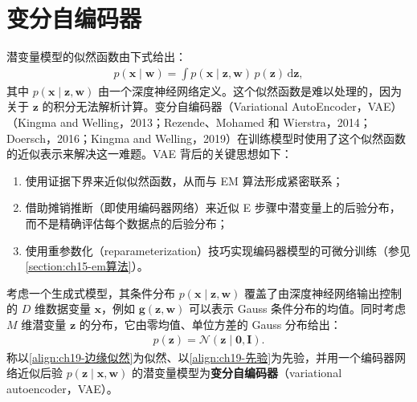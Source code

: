 \documentclass[../../main.tex]{subfiles}
\begin{document}
\section{变分自编码器}\label{section:ch19-变分自编码器}

潜变量模型的似然函数由下式给出：
\begin{align}
p(\bm{x}\mid\bm{w})=\int p(\bm{x}\mid\bm{z},\bm{w})\,p(\bm{z})\,\mathrm{d}\bm{z},
\label{align:ch19-边缘似然}
\end{align}
其中 $p(\bm{x}\mid\bm{z},\bm{w})$ 由一个深度神经网络定义。这个似然函数是难以处理的，因为关于 $\bm{z}$ 的积分无法解析计算。变分自编码器（Variational AutoEncoder，VAE）（Kingma and Welling，2013；Rezende、Mohamed 和 Wierstra，2014；Doersch，2016；Kingma and Welling，2019）在训练模型时使用了这个似然函数的近似表示来解决这一难题。VAE 背后的关键思想如下：
\begin{enumerate}[(1)]
\item 使用证据下界来近似似然函数，从而与 EM 算法形成紧密联系；
\item 借助摊销推断（即使用编码器网络）来近似 E 步骤中潜变量上的后验分布，而不是精确评估每个数据点的后验分布；
\item 使用重参数化（reparameterization）技巧实现编码器模型的可微分训练（参见\cref{section:ch15-em算法}）。
\end{enumerate}

\begin{definition}[变分自编码器]\label{definition:ch19-变分自编码器}
考虑一个生成式模型，其条件分布 $p(\bm{x}\mid\bm{z},\bm{w})$ 覆盖了由深度神经网络输出控制的 $D$ 维数据变量 $\bm{x}$，例如 $\bm{g}(\bm{z},\bm{w})$ 可以表示 Gauss 条件分布的均值。同时考虑 $M$ 维潜变量 $\bm{z}$ 的分布，它由零均值、单位方差的 Gauss 分布给出：
\begin{align}
p(\bm{z})=\mathcal{N}(\bm{z}\mid\bm{0},\bm{I}).
\label{align:ch19-先验}
\end{align}
称以\eqref{align:ch19-边缘似然}为似然、以\eqref{align:ch19-先验}为先验，并用一个编码器网络近似后验 $p(\bm{z}\mid\bm{x},\bm{w})$ 的潜变量模型为\textbf{变分自编码器}（variational autoencoder，VAE）。
\end{definition}
\end{document}
